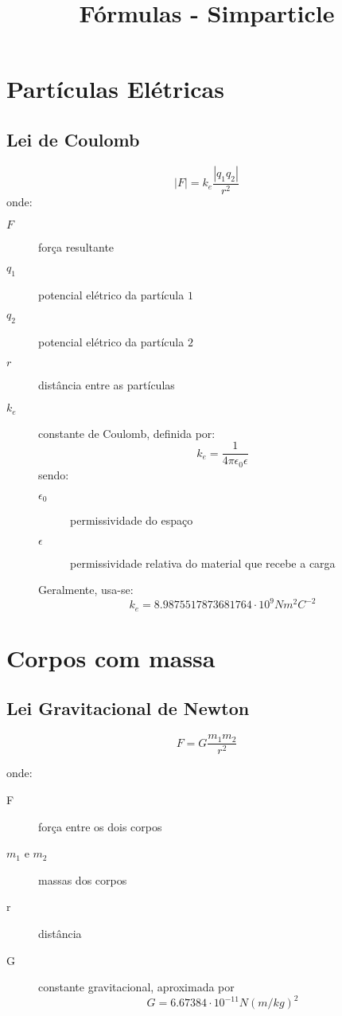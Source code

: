 \documentclass[a4paper,10pt]{article}
\title{Fórmulas - Simparticle}
\author{}
\begin{document}
\maketitle

\section{Partículas Elétricas}

	\subsection{Lei de Coulomb}
		
		\[
			\left|F\right| = k_e \frac{\left|q_1 q_2\right|}{r^2}
		\]
		onde:
		\begin{description}
		 \item [$F$] força resultante
		 \item [$q_1$] potencial elétrico da partícula $1$
		 \item [$q_2$] potencial elétrico da partícula $2$
		 \item [$r$] distância entre as partículas
		 \item [$k_e$] constante de Coulomb, definida por:
			\[
			 k_e = \frac{1}{4 \pi \epsilon_0 \epsilon}
			\]
			sendo:
			\begin{description}
			 \item [$\epsilon_0$] permissividade do espaço
			 \item [$\epsilon$] permissividade relativa do material que recebe a carga
			\end{description}
			Geralmente, usa-se:
			\[
			 k_e = 8.987 551 787 368 176 4 \cdot 10^9N m^2 C^{-2}
			\]


		\end{description}
		
\section{Corpos com massa}
	\subsection{Lei Gravitacional de Newton}
	
	\[ F = G\frac{m_1 m_2}{r^2} \]
	
	onde:
	\begin{description}
	 \item [F] força entre os dois corpos
	 \item [$m_1$ e $m_2$] massas dos corpos
	 \item [r] distância
	 \item [G] constante gravitacional, aproximada por \[ G = 6.67384 \cdot 10^{-11} N (m/kg)^2 \]
	\end{description}
\end{document}
